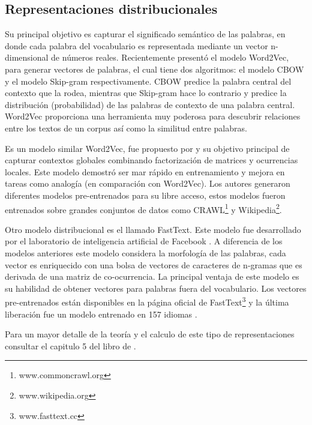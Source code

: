\subsection{Representaciones distribucionales}
Su principal objetivo es capturar el significado semántico de las palabras, en donde cada palabra del vocabulario es representada mediante un vector n-dimensional de números reales. Recientemente \citep{mikolov2013distributed} presentó el modelo Word2Vec, para generar vectores de palabras, el cual tiene dos algoritmos: el modelo CBOW y el modelo Skip-gram respectivamente. CBOW  predice la palabra central del contexto que la rodea, mientras que Skip-gram hace lo contrario y predice la distribución (probabilidad) de las palabras de contexto de una palabra central. Word2Vec proporciona una herramienta muy poderosa para descubrir relaciones entre los textos de un corpus así como la similitud entre palabras.

Es un modelo similar Word2Vec, fue propuesto por \citep{pennington2014glove} y su objetivo principal de capturar contextos globales combinando factorización de matrices y ocurrencias locales. Este modelo demostró ser mar rápido en entrenamiento y mejora en tareas como analogía (en comparación con Word2Vec). Los autores generaron diferentes modelos pre-entrenados para su libre acceso, estos modelos fueron entrenados sobre grandes conjuntos de datos como CRAWL\footnote{www.commoncrawl.org} y Wikipedia\footnote{www.wikipedia.org}.

Otro modelo distribucional es el llamado FastText. Este modelo fue desarrollado por el laboratorio de inteligencia artificial de Facebook \citep{mikolov2017advances}. A diferencia de los modelos anteriores este modelo considera la morfología de las palabras, cada vector es enriquecido con una bolsa de vectores de caracteres de n-gramas que es derivada de una matriz de co-ocurrencia. La  principal ventaja de este modelo es su habilidad de obtener vectores para palabras fuera del vocabulario. Los vectores pre-entrenados están disponibles en la página oficial de FastText\footnote{www.fasttext.cc}  y la última liberación fue un modelo entrenado en 157 idiomas \citep{grave2018learning}.

Para un mayor detalle de la teoría y el calculo de este tipo de representaciones consultar el capitulo 5 del libro de \cite{kamath2019deep}.